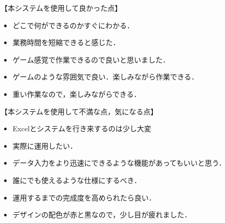 

【本システムを使用して良かった点】
\begin{itemize}
  \item どこで何ができるのかすぐにわかる．
  \item 業務時間を短縮できると感じた．
  \item ゲーム感覚で作業できるので良いと思いました．
  \item ゲームのような雰囲気で良い．楽しみながら作業できる．
  \item 重い作業なので，楽しみながらできる．
\end{itemize}

【本システムを使用して不満な点，気になる点】
\begin{itemize}
  \item Excelとシステムを行き来するのは少し大変
  \item 実際に運用したい．
  \item データ入力をより迅速にできるような機能があってもいいと思う．
  \item 誰にでも使えるような仕様にするべき．
  \item 運用するまでの完成度を高められたら良い．
  \item デザインの配色が赤と黒なので，少し目が疲れました．
\end{itemize}